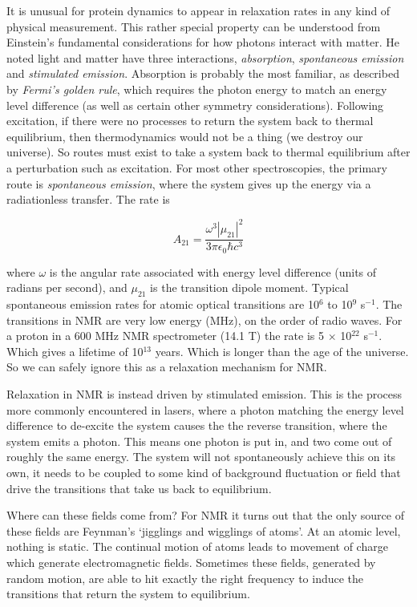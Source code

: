 \documentclass[notitlepage,11pt]{article}
\begin{document}
It is unusual for protein dynamics to appear in relaxation rates in any kind of physical measurement. This rather special property can be understood from Einstein's fundamental considerations for how photons interact with matter. He noted light and matter have three interactions, \emph{absorption}, \emph{spontaneous emission} and \emph{stimulated emission}. Absorption is probably the most familiar, as described by \emph{Fermi's golden rule}, which requires the photon energy to match an energy level difference (as well as certain other symmetry considerations). Following excitation, if there were no processes to return the system back to thermal equilibrium, then thermodynamics would not be a thing (we destroy our universe). So routes must exist to take a system back to thermal equilibrium after a perturbation such as excitation. For most other spectroscopies, the primary route is \emph{spontaneous emission}, where the system gives up the energy via a radiationless transfer. The rate is

\begin{equation}
  A_{21}=\frac{\omega^3 |\mu_{21}|^2}{3\pi \epsilon_0 \hbar c^3}
  \label{eq:ein}
  \end{equation}

where $\omega$ is the angular rate associated with energy level difference (units of radians per second), and $\mu_{21}$ is the transition dipole moment. Typical spontaneous emission rates for atomic optical transitions are 10$^{6}$ to 10$^9$ s$^{-1}$. The transitions in NMR are very low energy (MHz), on the order of radio waves. For a proton in a 600 MHz NMR spectrometer (14.1 T) the rate is 5 $\times$ 10$^{22}$ s$^{-1}$. Which gives a lifetime of 10$^{13}$ years. Which is longer than the age of the universe. So we can safely ignore this as a relaxation mechanism for NMR.

Relaxation in NMR is instead driven by stimulated emission. This is the process more commonly encountered in lasers, where a photon matching the energy level difference to de-excite the system causes the the reverse transition, where the system emits a photon. This means one photon is put in, and two come out of roughly the same energy. The system will not spontaneously achieve this on its own, it needs to be coupled to some kind of background fluctuation or field that drive the transitions that take us back to equilibrium.

Where can these fields come from? For NMR it turns out that the only source of these fields are Feynman's `jigglings and wigglings of atoms'. At an atomic level, nothing is static. The continual motion of atoms leads to movement of charge which generate electromagnetic fields. Sometimes these fields, generated by random motion, are able to hit exactly the right frequency to induce the transitions that return the system to equilibrium.
\end{document}

